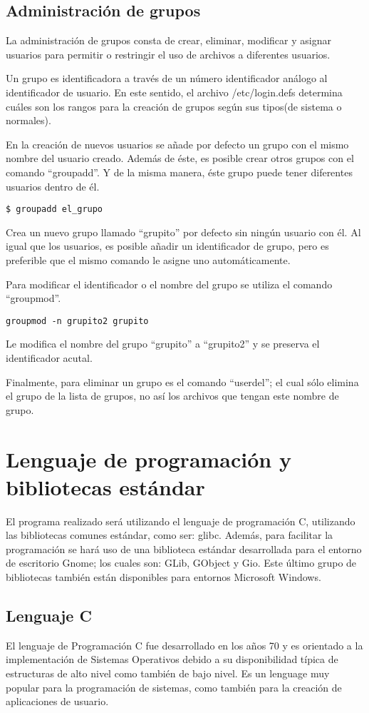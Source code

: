 \documentclass[letterpaper,10pt]{article}
\begin{document}
\subsection{Administración de grupos}
La administración de grupos consta de crear, eliminar, modificar y asignar usuarios para permitir o restringir el uso
de archivos a diferentes usuarios.

Un grupo es identificadora a través de un número identificador análogo al identificador de usuario. En este sentido,
el archivo /etc/login.defs determina cuáles son los rangos para la creación de grupos según sus tipos(de sistema o
normales).

En la creación de nuevos usuarios se añade por defecto un grupo con el mismo nombre del usuario creado. Además de éste, 
es posible crear otros grupos con el comando ``groupadd''. Y de la misma manera, éste grupo puede tener diferentes
usuarios dentro de él.
\begin{verbatim}
$ groupadd el_grupo
\end{verbatim}
Crea un nuevo grupo llamado ``grupito'' por defecto sin ningún usuario con él.
Al igual que los  usuarios, es posible añadir un identificador de grupo, pero es preferible que el mismo comando
le asigne uno automáticamente.

Para modificar el identificador o el nombre del grupo se utiliza el comando ``groupmod''.
\begin{verbatim}
groupmod -n grupito2 grupito
\end{verbatim}
Le modifica el nombre del grupo ``grupito'' a ``grupito2'' y se preserva el identificador acutal.

Finalmente, para eliminar un grupo es el comando ``userdel''; el cual sólo elimina el grupo de la lista
de grupos, no así los archivos que tengan este nombre de grupo.

\section{Lenguaje de programación y bibliotecas estándar}
El programa realizado será utilizando el lenguaje de programación C, utilizando las bibliotecas comunes estándar,
como ser: glibc.
Además, para facilitar la programación se hará uso de una biblioteca estándar desarrollada para el entorno de escritorio
Gnome; los cuales son: GLib, GObject y Gio. Este último grupo de bibliotecas también están disponibles
para entornos Microsoft Windows.

\subsection{Lenguaje C}
El lenguaje de Programación C fue desarrollado en los años 70 y es orientado a la implementación de Sistemas 
Operativos debido a su disponibilidad típica de estructuras de alto nivel como también de bajo nivel.
Es un lenguage muy popular para la programación de sistemas, como también para la creación de aplicaciones de usuario.
\end{document}

